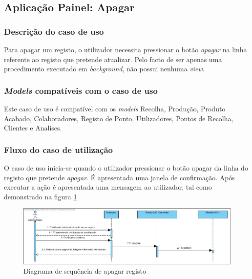 \subsection{Aplicação Painel: Apagar}
\subsubsection*{Descrição do caso de uso}
Para apagar um registo, o utilizador necessita pressionar o botão \textit{apagar} na linha referente ao registo que pretende atualizar. Pelo facto de ser apenas uma procedimento executado em \textit{background}, não possui nenhuma \textit{view}.

\subsubsection*{\textit{Models} compatíveis com o caso de uso}
Este caso de uso é compatível com os \textit{models} Recolha, Produção, Produto Acabado, Colaboradores, Registo de Ponto, Utilizadores, Pontos de Recolha, Clientes e Analises.

\subsubsection*{Fluxo do caso de utilização}
O caso de uso inicia-se quando o utilizador pressionar o botão apagar da linha do registo que pretende \textit{apagar}. É apresentada uma janela de confirmação. Após executar a ação é apresentada uma mensagem ao utilizador, tal como demonstrado na figura \ref{fig:sd_apagar}


\begin{figure}[H] 
	\begin{center}
		\includegraphics[width=\textwidth,keepaspectratio]{figuras/Diagramas_vp/SD_Painel_4_Apagar.jpg}
		\caption{Diagrama de sequência de apagar registo}
		\label{fig:sd_apagar} 
	\end{center}
\end{figure}